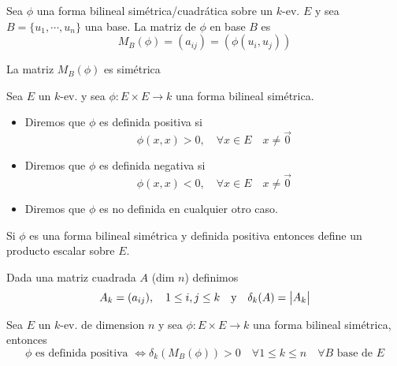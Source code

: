 \begin{defi}
	Sea $\phi$ una forma bilineal simétrica/cuadrática sobre un $k$-ev. $E$ y sea
	$B = \{u_1, \cdots, u_n \}$ una base. La matriz de $\phi$ en base $B$ es
	\[
	M_B(\phi) = (a_{ij}) = (\phi(u_i,u_j))
	\]
\end{defi}
\begin{obs}
	La matriz $M_B(\phi)$ es simétrica
\end{obs}
\begin{defi}
	Sea $E$ un $k$-ev. y sea $\phi \colon E \times E \to k$ una
	forma bilineal simétrica.
	\begin{itemize}
		\item Diremos que $\phi$ es definida positiva si 
		\[ \phi(x,x) > 0, \quad \forall x \in E
		\quad x \neq \vec{0} \]
		\item Diremos que $\phi$ es definida negativa si
		\[ \phi(x,x) < 0, \quad \forall x \in E
		\quad x \neq \vec{0} \]
		\item Diremos que $\phi$ es no definida en cualquier otro caso.
	\end{itemize}
\end{defi}
\begin{obs}
	Si $\phi$ es una forma bilineal simétrica y definida positiva
	entonces define un producto escalar sobre $E$.
\end{obs}
\begin{defi}
	Dada una matriz cuadrada $A$ (dim $n$) definimos
	\[
	A_k = (a_{ij}), \quad 1 \leq i, j \leq k \quad \text{y}
	\quad \delta_k(A) = \begin{vmatrix}A_k\end{vmatrix}
	\]
\end{defi}
\begin{thm}[de Sylvester]
	Sea $E$ un $k$-ev. de dimension $n$ y sea
	$\phi \colon E\times E \to k$ una forma bilineal simétrica,
	entonces
	\[
	\phi \text{ es definida positiva }\iff \delta_k(M_B(\phi)) > 0
	\quad\forall 1 \leq k \leq n \quad\forall B \text{ base de } E
	\]
\end{thm}
